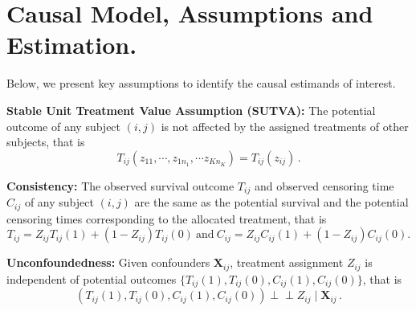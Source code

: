\documentclass[aoas]{imsart}
\theoremstyle{plain}
\theoremstyle{definition}
\begin{document}











\section{Causal Model, Assumptions and Estimation.}
Below, we present key assumptions to identify the causal estimands of interest.

\noindent \textbf{Stable Unit Treatment Value Assumption (SUTVA):} 
The potential outcome of any subject $(i,j)$ is not affected by the assigned treatments of other subjects, that is 
   \begin{equation}
   T_{ij}(z_{11},\cdots,z_{1n_1},\cdots z_{Kn_K}) = T_{ij}(z_{ij})
   \hspace{2pt} .
   \label{eq:SUTVA}
   \end{equation}


\noindent \textbf{Consistency:} The observed survival outcome $T_{ij}$ and observed censoring time $C_{ij}$ of any 
subject $(i,j)$ are the same as the potential survival and the potential censoring times corresponding to  the allocated treatment, that is
   \begin{equation}
   T_{ij} =  Z_{ij} T_{ij}(1) + (1-Z_{ij}) T_{ij}(0) \ \text{and}\  C_{ij} = Z_{ij} C_{ij}(1)  +(1-Z_{ij}) C_{ij}(0) 
   .
   \label{eq:Consistency_Outcome}
   \end{equation}

\noindent \textbf{Unconfoundedness:} 
Given confounders $ \mathbf{X}_{ij}$,
treatment assignment $Z_{ij}$ is independent of potential outcomes $\{T_{ij}(1),T_{ij}(0), C_{ij}(1),C_{ij}(0)\}$, 
that is    
\begin{equation}
  \left( T_{ij}(1), T_{ij}(0), C_{ij}(1),C_{ij}(0) \right) \perp\!\!\!\perp Z_{ij} \mid   \mathbf{X}_{ij}
   \hspace{2pt}. 
   \label{eq:Unconfoundedness}
   \end{equation}
\end{document}
